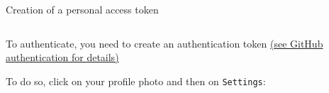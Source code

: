 \documentclass[10pt]{beamer}
\begin{document}
\begin{frame}[fragile]{Creation of a personal access token}

\begin{columns}
\begin{column}{0.6\textwidth}

To authenticate, you need to create an authentication token
\href{https://docs.github.com/en/authentication/keeping-your-account-and-data-secure/creating-a-personal-access-token}{(see GitHub authentication for details)}

\vspace{0.5cm}
To do so, click on your profile photo and then on \texttt{Settings}:

\end{column}
\begin{column}{0.33\textwidth}
    \begin{center}

\end{center}
\end{column}
\end{columns}
\end{frame}
\end{document}
